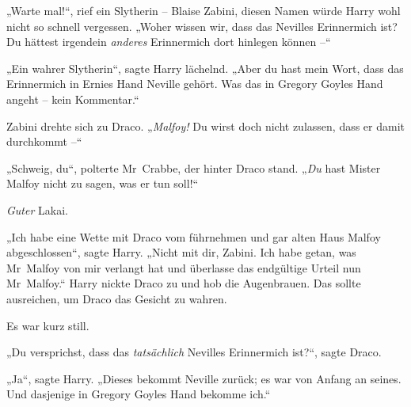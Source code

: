 „Warte mal!“, rief ein Slytherin – Blaise Zabini, diesen Namen würde Harry wohl nicht so schnell vergessen. „Woher wissen wir, dass das Nevilles Erinnermich ist? Du hättest irgendein \emph{anderes} Erinnermich dort hinlegen können –“

„Ein wahrer Slytherin“, sagte Harry lächelnd. „Aber du hast mein Wort, dass das Erinnermich in Ernies Hand Neville gehört. Was das in Gregory Goyles Hand angeht – kein Kommentar.“

Zabini drehte sich zu Draco. „\emph{Malfoy!} Du wirst doch nicht zulassen, dass er damit durchkommt –“

„Schweig, du“, polterte Mr~Crabbe, der hinter Draco stand. „\emph{Du} hast Mister Malfoy nicht zu sagen, was er tun soll!“

\emph{Guter} Lakai.

„Ich habe eine Wette mit Draco vom führnehmen und gar alten Haus Malfoy abgeschlossen“, sagte Harry. „Nicht mit dir, Zabini. Ich habe getan, was Mr~Malfoy von mir verlangt hat und überlasse das endgültige Urteil nun Mr~Malfoy.“ Harry nickte Draco zu und hob die Augenbrauen. Das sollte ausreichen, um Draco das Gesicht zu wahren.

Es war kurz still.

„Du versprichst, dass das \emph{tatsächlich} Nevilles Erinnermich ist?“, sagte Draco.

„Ja“, sagte Harry. „Dieses bekommt Neville zurück; es war von Anfang an seines. Und dasjenige in Gregory Goyles Hand bekomme ich.“

